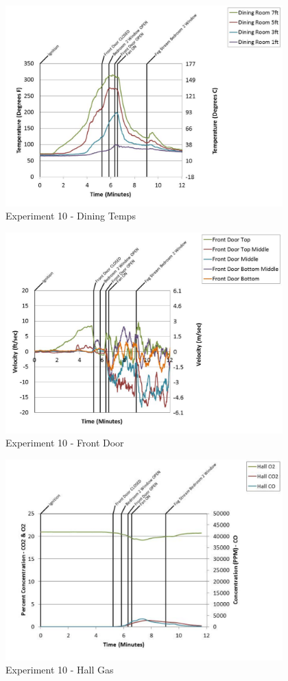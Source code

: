 \documentclass{article}
\begin{document}
\begin{appendices}
	\begin{figure}[h!]
		\centering
		\includegraphics[height=3.05in]{0_Images/Results_Charts/Exp_10_Charts/DiningTemps.pdf}
		\caption{Experiment 10 - Dining Temps}
	\end{figure}
 
	\clearpage

	\begin{figure}[h!]
		\centering
		\includegraphics[height=3.05in]{0_Images/Results_Charts/Exp_10_Charts/FrontDoor.pdf}
		\caption{Experiment 10 - Front Door}
	\end{figure}
 

	\begin{figure}[h!]
		\centering
		\includegraphics[height=3.05in]{0_Images/Results_Charts/Exp_10_Charts/HallGas.pdf}
		\caption{Experiment 10 - Hall Gas}
	\end{figure}
 

\end{appendices}
\end{document}
